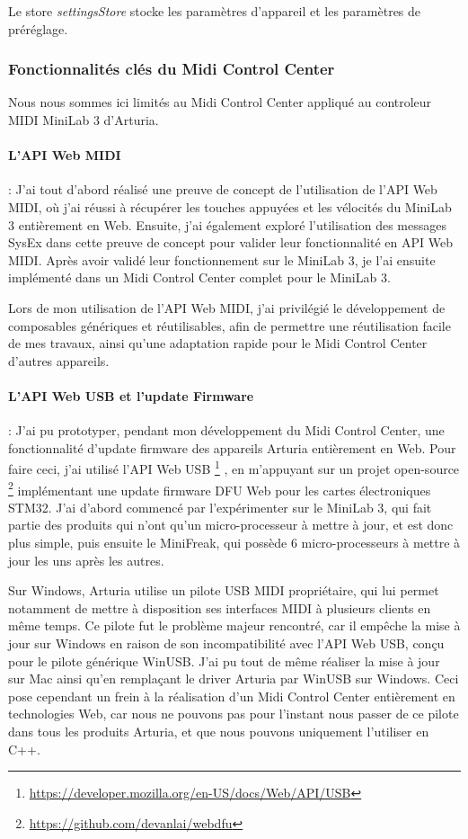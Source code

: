 \documentclass[francais]{rapportPFE}  %
\begin{document}
Le store \textit{settingsStore} stocke les paramètres d'appareil et les paramètres de préréglage.



\subsubsection{Fonctionnalités clés du Midi Control Center}

Nous nous sommes ici limités au Midi Control Center appliqué au controleur MIDI MiniLab 3 d'Arturia.

\paragraph{L'API Web MIDI}:
J'ai tout d'abord réalisé une preuve de concept de l'utilisation de l'API Web MIDI, où j'ai réussi à récupérer les touches appuyées et les vélocités du MiniLab 3 entièrement en Web. Ensuite, j'ai également exploré l'utilisation des messages SysEx dans cette preuve de concept pour valider leur fonctionnalité en API Web MIDI.
Après avoir validé leur fonctionnement sur le MiniLab 3, je l'ai ensuite implémenté dans un Midi Control Center complet pour le MiniLab 3. 

Lors de mon utilisation de l'API Web MIDI, j'ai privilégié le développement de composables génériques et réutilisables, afin de permettre une réutilisation facile de mes travaux, ainsi qu'une adaptation rapide pour le Midi Control Center d'autres appareils.


\paragraph{L'API Web USB et l'update Firmware}:
J'ai pu prototyper, pendant mon développement du Midi Control Center, une fonctionnalité d'update firmware des appareils Arturia entièrement en Web. Pour faire ceci, j'ai utilisé l'API Web USB
\footnote{\url{https://developer.mozilla.org/en-US/docs/Web/API/USB}} 
, en m'appuyant sur un projet open-source 
\footnote{\url{https://github.com/devanlai/webdfu}}
implémentant une update firmware DFU Web pour les cartes électroniques STM32.
J'ai d'abord commencé par l'expérimenter sur le MiniLab 3, qui fait partie des produits qui n'ont qu'un micro-processeur à mettre à jour, et est donc plus simple, puis ensuite le MiniFreak, qui possède 6 micro-processeurs à mettre à jour les uns après les autres.

Sur Windows, Arturia utilise un pilote USB MIDI propriétaire, qui lui permet notamment de mettre à disposition ses interfaces MIDI à plusieurs clients en même temps. Ce pilote fut le problème majeur rencontré, car il empêche la mise à jour sur Windows en raison de son incompatibilité avec l'API Web USB, conçu pour le pilote générique WinUSB. J'ai pu tout de même réaliser la mise à jour sur Mac ainsi qu'en remplaçant le driver Arturia par WinUSB sur Windows. Ceci pose cependant un frein à la réalisation d'un Midi Control Center entièrement en technologies Web, car nous ne pouvons pas pour l'instant nous passer de ce pilote dans tous les produits Arturia, et que nous pouvons uniquement l'utiliser en C++.
\end{document}
